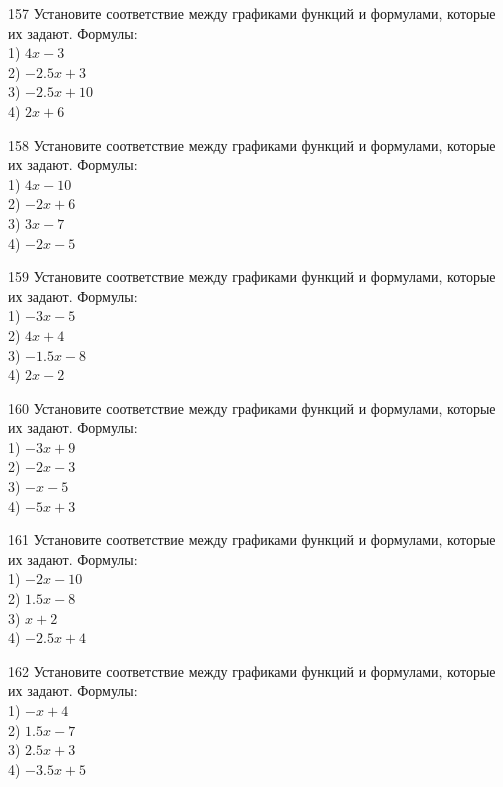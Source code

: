 \documentclass[4apaper]{article}
\begin{document}
\begin{taskBN}{157}
Установите соответствие между графиками функций и формулами, которые их задают. Формулы: \\1) $4x-3$\\2) $-2.5x+3$\\3) $-2.5x+10$\\4) $2x+6$
\end{taskBN}

\begin{taskBN}{158}
Установите соответствие между графиками функций и формулами, которые их задают. Формулы: \\1) $4x-10$\\2) $-2x+6$\\3) $3x-7$\\4) $-2x-5$
\end{taskBN}

\begin{taskBN}{159}
Установите соответствие между графиками функций и формулами, которые их задают. Формулы: \\1) $-3x-5$\\2) $4x+4$\\3) $-1.5x-8$\\4) $2x-2$
\end{taskBN}

\begin{taskBN}{160}
Установите соответствие между графиками функций и формулами, которые их задают. Формулы: \\1) $-3x+9$\\2) $-2x-3$\\3) $-x-5$\\4) $-5x+3$
\end{taskBN}

\begin{taskBN}{161}
Установите соответствие между графиками функций и формулами, которые их задают. Формулы: \\1) $-2x-10$\\2) $1.5x-8$\\3) $x+2$\\4) $-2.5x+4$
\end{taskBN}

\begin{taskBN}{162}
Установите соответствие между графиками функций и формулами, которые их задают. Формулы: \\1) $-x+4$\\2) $1.5x-7$\\3) $2.5x+3$\\4) $-3.5x+5$
\end{taskBN}
\end{document}

